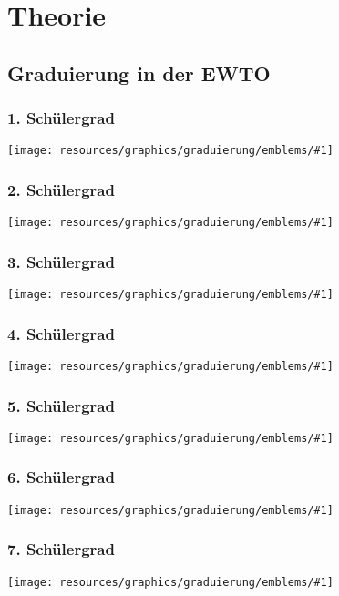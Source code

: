 
\newenvironment{WTGradSG}[1]{
	\subsection*{#1. Sch\"ulergrad}
	\texttt{[image: resources/graphics/graduierung/emblems/\#1]}
}{
}


\renewcommand\chapterillustration{pushing_minimalistisch}
\chapter{Theorie}



\section{Graduierung in der EWTO}
\begin{WTGradSG}{1}

\end{WTGradSG}
\begin{WTGradSG}{2}

\end{WTGradSG}
\begin{WTGradSG}{3}

\end{WTGradSG}
\begin{WTGradSG}{4}

\end{WTGradSG}
\begin{WTGradSG}{5}

\end{WTGradSG}
\begin{WTGradSG}{6}

\end{WTGradSG}
\begin{WTGradSG}{7}

\end{WTGradSG}
